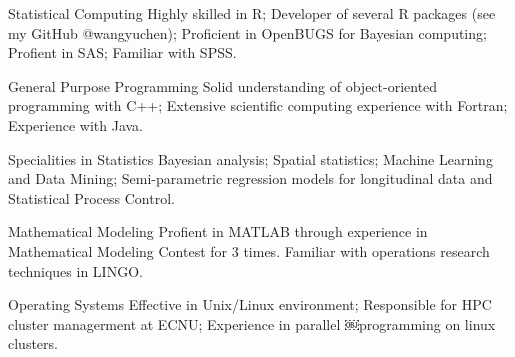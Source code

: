 \documentclass[10pt]{article}
\newcommand{\CPP}
{C\nolinebreak[4]\hspace{-.05em}\raisebox{.22ex}{\footnotesize\bf ++}}
\begin{document}
\begin{description*}
	\item[Statistical Computing] Highly skilled in R; Developer of several R packages (see my GitHub @wangyuchen); Proficient in OpenBUGS for Bayesian computing; Profient in SAS; Familiar with SPSS.
	\item[General Purpose Programming] Solid understanding of object-oriented programming with C++; Extensive scientific computing experience with Fortran; Experience with Java.
	\item[Specialities in Statistics] Bayesian analysis; Spatial statistics; Machine Learning and Data Mining; Semi-parametric regression models for longitudinal data and Statistical Process Control.
	\item[Mathematical Modeling] Profient in MATLAB through experience in Mathematical Modeling Contest for 3 times. Familiar with operations research techniques in LINGO.
	\item[Operating Systems] Effective in Unix/Linux environment; Responsible for HPC cluster managerment at ECNU; Experience in parallel ￼programming on linux clusters.
\end{description*}
\end{document}
